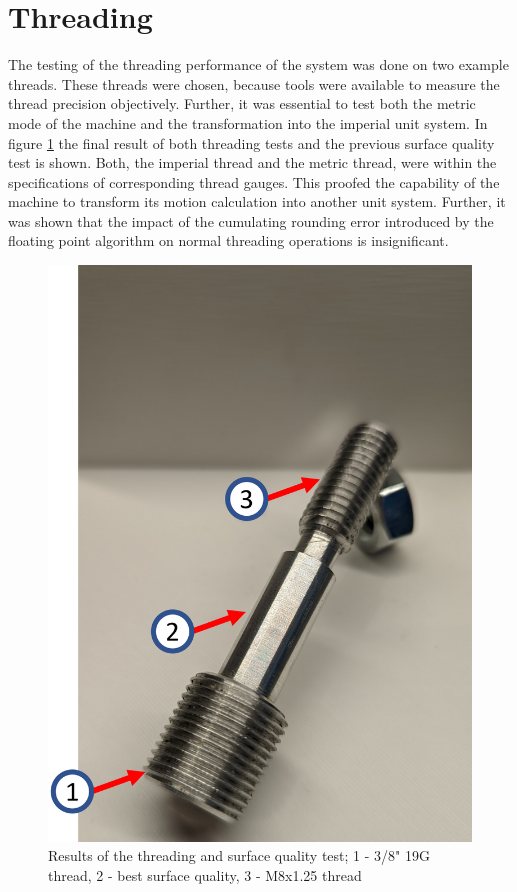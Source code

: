 \section{Threading}
The testing of the threading performance of the system was done on two example threads. These threads were chosen, because tools were available to measure the thread precision objectively. Further, it was essential to test both the metric mode of the machine and the transformation into the imperial unit system. In figure \ref{ResThread} the final result of both threading tests and the previous surface quality test is shown. Both, the imperial thread and the metric thread, were within the specifications of corresponding thread gauges. This proofed the capability of the machine to transform its motion calculation into another unit system. Further, it was shown that the impact of the cumulating rounding error introduced by the floating point algorithm on normal threading operations is insignificant.
 
\begin{figure}
    \begin{center}
    \includegraphics[width=12cm]{Pictures/ResThreadSurf.png}
    \caption[Results of the threading and surface quality test]{Results of the threading and surface quality test; 1 - 3/8" 19G thread, 2 - best surface quality, 3 - M8x1.25 thread}
    \label{ResThread}
    \end{center}
\end{figure}
 
